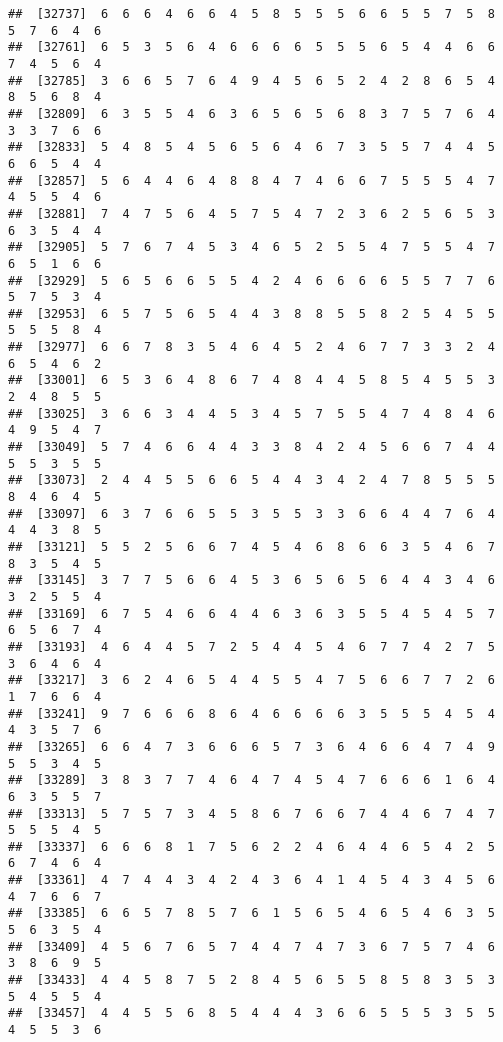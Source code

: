 \documentclass[
]{book}
\begin{document}
\begin{verbatim}
##  [32737]  6  6  6  4  6  6  4  5  8  5  5  5  6  6  5  5  7  5  8  5  7  6  4  6
##  [32761]  6  5  3  5  6  4  6  6  6  6  5  5  5  6  5  4  4  6  6  7  4  5  6  4
##  [32785]  3  6  6  5  7  6  4  9  4  5  6  5  2  4  2  8  6  5  4  8  5  6  8  4
##  [32809]  6  3  5  5  4  6  3  6  5  6  5  6  8  3  7  5  7  6  4  3  3  7  6  6
##  [32833]  5  4  8  5  4  5  6  5  6  4  6  7  3  5  5  7  4  4  5  6  6  5  4  4
##  [32857]  5  6  4  4  6  4  8  8  4  7  4  6  6  7  5  5  5  4  7  4  5  5  4  6
##  [32881]  7  4  7  5  6  4  5  7  5  4  7  2  3  6  2  5  6  5  3  6  3  5  4  4
##  [32905]  5  7  6  7  4  5  3  4  6  5  2  5  5  4  7  5  5  4  7  6  5  1  6  6
##  [32929]  5  6  5  6  6  5  5  4  2  4  6  6  6  6  5  5  7  7  6  5  7  5  3  4
##  [32953]  6  5  7  5  6  5  4  4  3  8  8  5  5  8  2  5  4  5  5  5  5  5  8  4
##  [32977]  6  6  7  8  3  5  4  6  4  5  2  4  6  7  7  3  3  2  4  6  5  4  6  2
##  [33001]  6  5  3  6  4  8  6  7  4  8  4  4  5  8  5  4  5  5  3  2  4  8  5  5
##  [33025]  3  6  6  3  4  4  5  3  4  5  7  5  5  4  7  4  8  4  6  4  9  5  4  7
##  [33049]  5  7  4  6  6  4  4  3  3  8  4  2  4  5  6  6  7  4  4  5  5  3  5  5
##  [33073]  2  4  4  5  5  6  6  5  4  4  3  4  2  4  7  8  5  5  5  8  4  6  4  5
##  [33097]  6  3  7  6  6  5  5  3  5  5  3  3  6  6  4  4  7  6  4  4  4  3  8  5
##  [33121]  5  5  2  5  6  6  7  4  5  4  6  8  6  6  3  5  4  6  7  8  3  5  4  5
##  [33145]  3  7  7  5  6  6  4  5  3  6  5  6  5  6  4  4  3  4  6  3  2  5  5  4
##  [33169]  6  7  5  4  6  6  4  4  6  3  6  3  5  5  4  5  4  5  7  6  5  6  7  4
##  [33193]  4  6  4  4  5  7  2  5  4  4  5  4  6  7  7  4  2  7  5  3  6  4  6  4
##  [33217]  3  6  2  4  6  5  4  4  5  5  4  7  5  6  6  7  7  2  6  1  7  6  6  4
##  [33241]  9  7  6  6  6  8  6  4  6  6  6  6  3  5  5  5  4  5  4  4  3  5  7  6
##  [33265]  6  6  4  7  3  6  6  6  5  7  3  6  4  6  6  4  7  4  9  5  5  3  4  5
##  [33289]  3  8  3  7  7  4  6  4  7  4  5  4  7  6  6  6  1  6  4  6  3  5  5  7
##  [33313]  5  7  5  7  3  4  5  8  6  7  6  6  7  4  4  6  7  4  7  5  5  5  4  5
##  [33337]  6  6  6  8  1  7  5  6  2  2  4  6  4  4  6  5  4  2  5  6  7  4  6  4
##  [33361]  4  7  4  4  3  4  2  4  3  6  4  1  4  5  4  3  4  5  6  4  7  6  6  7
##  [33385]  6  6  5  7  8  5  7  6  1  5  6  5  4  6  5  4  6  3  5  5  6  3  5  4
##  [33409]  4  5  6  7  6  5  7  4  4  7  4  7  3  6  7  5  7  4  6  3  8  6  9  5
##  [33433]  4  4  5  8  7  5  2  8  4  5  6  5  5  8  5  8  3  5  3  5  4  5  5  4
##  [33457]  4  4  5  5  6  8  5  4  4  4  3  6  6  5  5  5  3  5  5  4  5  5  3  6

\end{verbatim}
\end{document}
